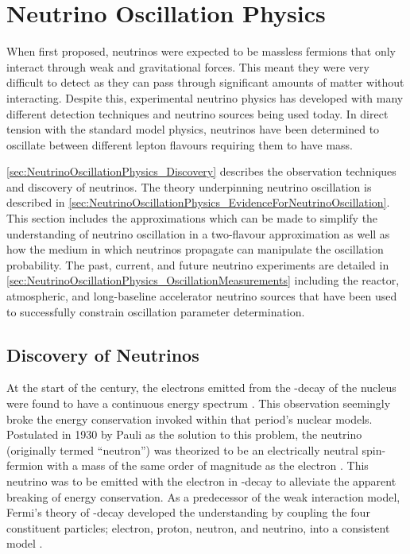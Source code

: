 \chapter{Neutrino Oscillation Physics}
\label{chap:NeutrinoOscillationPhysics}

When first proposed, neutrinos were expected to be massless fermions that only interact through weak and gravitational forces. This meant they were very difficult to detect as they can pass through significant amounts of matter without interacting. Despite this, experimental neutrino physics has developed with many different detection techniques and neutrino sources being used today. In direct tension with the standard model physics, neutrinos have been determined to oscillate between different lepton flavours requiring them to have mass.

\autoref{sec:NeutrinoOscillationPhysics_Discovery} describes the observation techniques and discovery of neutrinos. The theory underpinning neutrino oscillation is described in \autoref{sec:NeutrinoOscillationPhysics_EvidenceForNeutrinoOscillation}. This section includes the approximations which can be made to simplify the understanding of neutrino oscillation in a two-flavour approximation as well as how the medium in which neutrinos propagate can manipulate the oscillation probability. The past, current, and future neutrino experiments are detailed in \autoref{sec:NeutrinoOscillationPhysics_OscillationMeasurements} including the reactor, atmospheric, and long-baseline accelerator neutrino sources that have been used to successfully constrain oscillation parameter determination.

\section{Discovery of Neutrinos}
\label{sec:NeutrinoOscillationPhysics_Discovery}

At the start of the  century, the electrons emitted from the \quickmath{\beta}-decay of the nucleus were found to have a continuous energy spectrum \cite{Chadwick:262756, Ellis1927-qf}. This observation seemingly broke the energy conservation invoked within that period's nuclear models.  Postulated in 1930 by Pauli as the solution to this problem, the neutrino (originally termed ``neutron'') was theorized to be an electrically neutral spin- fermion with a mass of the same order of magnitude as the electron \cite{Pauli:1930pc}. This neutrino was to be emitted with the electron in \quickmath{\beta}-decay to alleviate the apparent breaking of energy conservation. As a predecessor of the weak interaction model, Fermi's theory of \quickmath{\beta}-decay developed the understanding by coupling the four constituent particles; electron, proton, neutron, and neutrino, into a consistent model \cite{Fermi:1934hr}.

